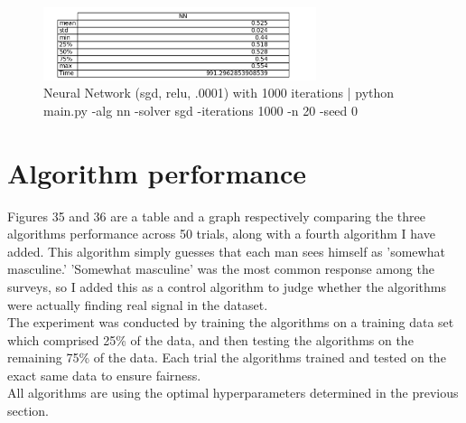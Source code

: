 \documentclass{article}
\begin{document}
\begin{figure}
\begin{center}
\includegraphics[width=8cm]{images/nn_1000}
\caption{Neural Network (sgd, relu, .0001) with 1000 iterations | python main.py -alg nn -solver sgd -iterations 1000 -n 20 -seed 0}
\end{center}
\end{figure}

\section{Algorithm performance}

Figures 35 and 36 are a table and a graph respectively comparing the three algorithms performance across 50 trials, along with a fourth algorithm I have added. This algorithm simply guesses that each man sees himself as 'somewhat masculine.' 'Somewhat masculine' was the most common response among the surveys, so I added this as a control algorithm to judge whether the algorithms were actually finding real signal in the dataset.\\

The experiment was conducted by training the algorithms on a training data set which comprised 25\% of the data, and then testing the algorithms on the remaining 75\% of the data. Each trial the algorithms trained and tested on the exact same data to ensure fairness.\\

All algorithms are using the optimal hyperparameters determined in the previous section.\\
\end{document}
